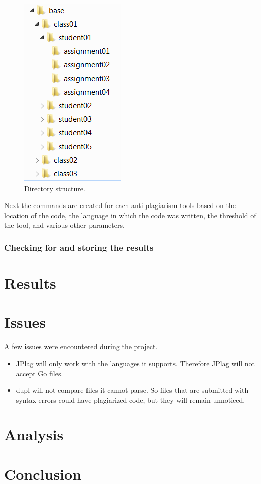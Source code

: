 \documentclass[12pt]{article}
\begin{document}
			\begin{figure}[h!]
				\includegraphics[scale=0.75]{Directories.png}
				\caption{Directory structure.}
				\label{fig:directories}
			\end{figure}
			
			Next the commands are created for each anti-plagiarism tools based on the location of the code, the language in which the code was written, the threshold of the tool, and various other parameters.
			
			\subsubsection{Checking for and storing the results}
			
	\section{Results}
	\section{Issues}
		A few issues were encountered during the project.
		\begin{itemize}
			\item JPlag will only work with the languages it supports. Therefore JPlag will not accept Go files. 
			\item dupl will not compare files it cannot parse. So files that are submitted with syntax errors could have plagiarized code, but they will remain unnoticed.
		\end{itemize}
	\section{Analysis}
	\section{Conclusion}
	
	
\end{document}
